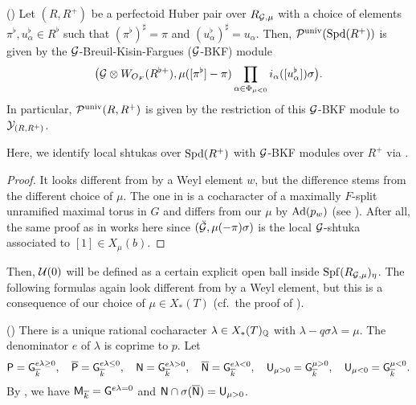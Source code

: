 \documentclass[12pt,reqno]{amsart}
\begin{document}
\begin{prop}\textup{(\cite[Corollary 2.9]{Tak25z})} \label{lem:expBKF}
    Let $(R, R^+)$ be a perfectoid Huber pair over $R_{{\mathcal{G}}, \mu}$ with a choice of elements $\pi^\flat, u_\alpha^\flat \in R^\flat$ such that $(\pi^\flat)^\sharp = \pi$ and $(u_\alpha^\flat)^\sharp=u_\alpha$. Then, ${\mathcal{P}}^{\operatorname{univ}}({\operatorname{Spd}}(R^+))$ is given by the ${\mathcal{G}}$-Breuil-Kisin-Fargues \textup{(${\mathcal{G}}$-BKF)} module 
    \[
        \bigl({\mathcal{G}}\otimes W_{O_F}(R^{\flat +}), \mu([\pi^\flat]-\pi) \prod_{\alpha \in \Phi_{\mu<0}} i_\alpha([u_\alpha^\flat]) \sigma\bigr). 
    \]
    In particular, ${\mathcal{P}}^{\operatorname{univ}}(R, R^+)$ is given by the restriction of this ${\mathcal{G}}$-BKF module to ${\mathcal{Y}}_{(R, R^+)}$. 
\end{prop}

Here, we identify local shtukas over ${\operatorname{Spd}}(R^+)$ with ${\mathcal{G}}$-BKF modules over $R^+$ via \cite{Gut23}. %

\begin{proof}
    It looks different from \cite[Corollary 2.9]{Tak25z} by a Weyl element $w$, but the difference stems from the different choice of $\mu$. The one in \cite{Tak25z} is a cocharacter of a maximally $F$-split unramified maximal torus in $G$ and differs from our $\mu$ by ${\operatorname{Ad}}(p_w)$ (see ). After all, the same proof as in \cite[Corollary 2.9]{Tak25z} works here since $(\breve{{\mathcal{G}}}, \mu(-\pi)\sigma)$ is the local ${\mathcal{G}}$-shtuka associated to $[1] \in X_\mu(b)$. 
\end{proof}

Then, ${\mathcal{U}}(0)$ will be defined as a certain explicit open ball inside ${\operatorname{Spf}}(R_{{\mathcal{G}}, \mu})_\eta$. The following formulas again look different from \cite{Tak25z} by a Weyl element, but this is a consequence of our choice of $\mu \in X_*(T)$ (cf.\ the proof of ). 

\begin{defi}\textup{(\cite[Section 3.1]{Tak25z})} \label{defi:parabolic_mu}
    There is a unique rational cocharacter $\lambda \in X_*(T)_{\mathbb{Q}}$ with $\lambda - q\sigma \lambda = \mu$. The denominator $e$ of $\lambda$ is coprime to $p$. Let
    \[
        {\mathsf{P}} = {\mathsf{G}}_{{\overline{k}}}^{e\lambda \geq 0} ,\quad 
        {\overline{{\mathsf{P}}}} = {\mathsf{G}}_{{\overline{k}}}^{e\lambda \leq 0} ,\quad 
        {\mathsf{N}} = {\mathsf{G}}_{{\overline{k}}}^{e\lambda > 0} ,\quad
        {\overline{{\mathsf{N}}}} = {\mathsf{G}}_{{\overline{k}}}^{e\lambda < 0}, \quad 
        {\mathsf{U}}_{\mu>0} = {\mathsf{G}}_{{\overline{k}}}^{\mu > 0} ,\quad
        {\mathsf{U}}_{\mu<0} = {\mathsf{G}}_{{\overline{k}}}^{\mu < 0}.  
    \]
    By \cite[Lemma 3.2, Proposition 3.6]{Tak25z}, we have ${\mathsf{M}}_{{\overline{k}}} = {\mathsf{G}}^{e\lambda = 0}$ and ${\mathsf{N}} \cap \sigma({\mathsf{{\overline{N}}}}) = {\mathsf{U}}_{\mu > 0}$. 
\end{defi}
\end{document}
